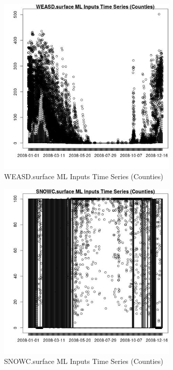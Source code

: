 \begin{figure} 
\centering  
\includegraphics[width=0.77\textwidth]{Code_Outputs/ML_input_report_ML_input_CountyGeometricCentroids_Locations_Dates_part_c_2008-01-01to2008-12-31_WEASD.surfaceTS.jpg} 
\caption{\label{fig:ML_input_report_ML_input_CountyGeometricCentroids_Locations_Dates_part_c_2008-01-01to2008-12-31WEASD.surfaceTS}WEASD.surface ML Inputs Time Series (Counties)} 
\end{figure} 
 

\begin{figure} 
\centering  
\includegraphics[width=0.77\textwidth]{Code_Outputs/ML_input_report_ML_input_CountyGeometricCentroids_Locations_Dates_part_c_2008-01-01to2008-12-31_SNOWC.surfaceTS.jpg} 
\caption{\label{fig:ML_input_report_ML_input_CountyGeometricCentroids_Locations_Dates_part_c_2008-01-01to2008-12-31SNOWC.surfaceTS}SNOWC.surface ML Inputs Time Series (Counties)} 
\end{figure} 
 


